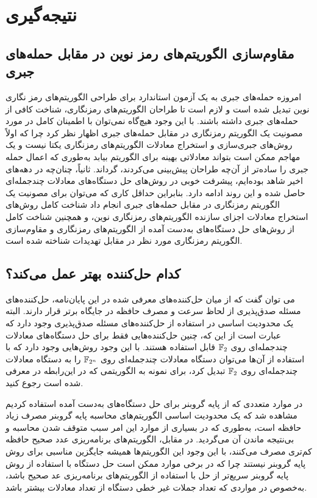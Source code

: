 \section{نتیجه‌گیری}
\subsection{مقاوم‌سازی الگوریتم‌های رمز نوین در مقابل حمله‌های جبری }
امروزه حمله‌های جبری به یک آزمون استاندارد  برای طراحی الگوریتم‌های رمز نگاری  نوین تبدیل شده  است و لازم است تا  طراحان الگوریتم‌های رمزنگاری،  شناخت کافی از حمله‌های جبری داشته باشند.  با این وجود هیچ‌گاه نمی‌توان با اطمینان کامل در مورد مصونیت یک  الگوریتم رمزنگاری در مقابل حمله‌های جبری  اظهار نظر کرد چرا که اولاً روش‌های جبری‌سازی و استخراج معادلات الگوریتم‌های رمزنگاری یکتا نیست و یک مهاجم ممکن است بتواند معادلاتی بهینه برای الگوریتم بیابد به‌طوری که  اعمال حمله جبری را ساده‌تر از آن‌چه طراحان پیش‌بینی می‌کردند، گرداند. ثانیاً، چنان‌چه در دهه‌های اخیر شاهد بوده‌ایم، پیشرفت خوبی در روش‌های حل دستگاه‌های معادلات چندجمله‌ای حاصل شده و این روند ادامه دارد.  بنابراین حداقل  کاری که می‌توان برای مصونیت یک الگوریتم رمزنگاری در مقابل حمله‌های جبری انجام داد شناخت کامل  روش‌های استخراج معادلات  اجزای سازنده الگوریتم‌های رمزنگاری نوین، و همچنین شناخت کامل از روش‌های حل دستگاه‌های به‌دست آمده از  الگوریتم‌های رمزنگاری  و مقاوم‌سازی الگوریتم رمزنگاری مورد نظر در مقابل تهدیدات شناخته شده است. 
\subsection{کدام حل‌کننده بهتر عمل می‌کند؟}
می توان گفت که از میان حل‌کننده‌های معرفی شده در این پایان‌نامه، حل‌کننده‌های مسئله‌ صدق‌پذیری از لحاظ سرعت و مصرف حافظه در جایگاه برتر قرار دارند.   البته  یک محدودیت اساسی در استفاده از حل‌کننده‌های مسئله صدق‌پذیری وجود دارد که عبارت است از این که، چنین حل‌کننده‌هایی فقط برای حل دستگاه‌های معادلات چندجمله‌ای روی 
$\mathbb{F}_{2}$
قابل استفاده هستند. با این وجود روش‌هایی وجود دارد که با استفاده از آن‌ها می‌توان دستگاه معادلات چندجمله‌ای روی 
$\mathbb{F}_{2^{n}}$
را به دستگاه معادلات چندجمله‌‌ای روی 
$\mathbb{F}_{2}$
 تبدیل کرد، برای نمونه به الگوریتمی که در این‌رابطه در 
 \cite{jovanovic2010algebraic}
 معرفی شده است رجوع کنید.  
 
 در موارد متعددی که از پایه گروبنر برای حل دستگاه‌های به‌دست آمده استفاده کردیم مشاهده شد که یک محدودیت اساسی  الگوریتم‌های محاسبه پایه گروبنر مصرف زیاد حافظه است، به‌طوری که در بسیاری از موارد این امر سبب متوقف شدن محاسبه و بی‌نتیجه ماندن آن می‌گردید. در مقابل، الگوریتم‌های برنامه‌ریزی عدد صحیح حافظه کم‌تری مصرف می‌کنند، با این وجود  این الگوریتم‌ها همیشه جایگزین مناسبی برای روش پایه گروبنر نیستند چرا که در برخی موارد ممکن است حل دستگاه  با استفاده از روش پایه گروبنر سریع‌تر از حل با استفاده از الگوریتم‌های برنامه‌ریزی عد صحیح باشد، به‌خصوص در مواردی که تعداد جملات غیر خطی  دستگاه از تعداد معادلات بیشتر باشد. 
 
